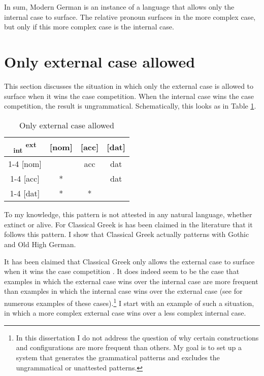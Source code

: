 In sum, Modern German is an instance of a language that allows only the internal case to surface. The relative pronoun surfaces in the more complex case, but only if this more complex case is the internal case.

\section{Only external case allowed}\label{sec:pattern-iii}

This section discusses the situation in which only the external case is allowed to surface when it wins the case competition. When the internal case wins the case competition, the result is ungrammatical. Schematically, this looks as in Table \ref{tbl:case-competition-only-ext-repeated}.

\begin{table}[H]
  \center
  \caption{Only external case allowed}
  \begin{tabular}{c|c|c|c}
    \toprule
    \textsubscript{\ac{int}} \textsuperscript{\ac{ext}}
           & [\ac{nom}]
           & [\ac{acc}]
           & [\ac{dat}]
           \\ \cmidrule{1-4}
       [\ac{nom}]
           & \xcancel{\phantom{xx}}
           & \ac{acc}
           & \ac{dat}
           \\ \cmidrule{1-4}
       [\ac{acc}]
           & *
           & \xcancel{\phantom{xx}}
           & \ac{dat}
           \\ \cmidrule{1-4}
       [\ac{dat}]
           & *
           & *
           & \xcancel{\phantom{xx}}
           \\
     \bottomrule
  \end{tabular}
    \label{tbl:case-competition-only-ext-repeated}
\end{table}

To my knowledge, this pattern is not attested in any natural language, whether extinct or alive. For Classical Greek is has been claimed in the literature that it follows this pattern. I show that Classical Greek actually patterns with Gothic and Old High German.

It has been claimed that Classical Greek only allows the external case to surface when it wins the case competition  \citep[cf.][]{cinqueforthcoming}. It does indeed seem to be the case that examples in which the external case wins over the internal case are more frequent than examples in which the internal case wins over the external case (see \citealt{kakarikos2014} for numerous examples of these cases).\footnote{
In this dissertation I do not address the question of why certain constructions and configurations are more frequent than others. My goal is to set up a system that generates the grammatical patterns and excludes the ungrammatical or unattested patterns.
} I start with an example of such a situation, in which a more complex external case wins over a less complex internal case.

